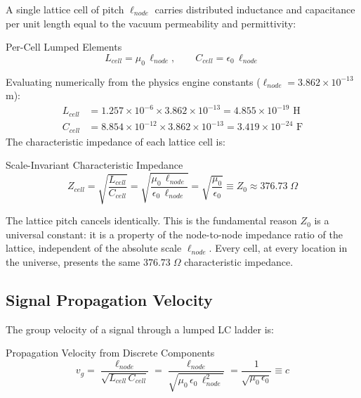 A single lattice cell of pitch $\ell_{node}$ carries distributed inductance and capacitance per unit length equal to the vacuum permeability and permittivity:
\begin{resultbox}{Per-Cell Lumped Elements}
\begin{equation}
    L_{cell} = \mu_0\, \ell_{node}, \qquad C_{cell} = \epsilon_0\, \ell_{node}
    \label{eq:cell_elements}
\end{equation}
\end{resultbox}

Evaluating numerically from the physics engine constants ($\ell_{node} = 3.862 \times 10^{-13}$ m):
\begin{align}
    L_{cell} &= 1.257 \times 10^{-6} \times 3.862 \times 10^{-13} = 4.855 \times 10^{-19} \text{ H} \\
    C_{cell} &= 8.854 \times 10^{-12} \times 3.862 \times 10^{-13} = 3.419 \times 10^{-24} \text{ F}
\end{align}
The characteristic impedance of each lattice cell is:
\begin{resultbox}{Scale-Invariant Characteristic Impedance}
\begin{equation}
    Z_{cell} = \sqrt{\frac{L_{cell}}{C_{cell}}} = \sqrt{\frac{\mu_0\, \ell_{node}}{\epsilon_0\, \ell_{node}}} = \sqrt{\frac{\mu_0}{\epsilon_0}} \equiv Z_0 \approx 376.73\;\Omega
    \label{eq:z0_cell}
\end{equation}
\end{resultbox}

The lattice pitch cancels identically. This is the fundamental reason $Z_0$ is a universal constant: it is a property of the node-to-node impedance ratio of the lattice, independent of the absolute scale $\ell_{node}$. Every cell, at every location in the universe, presents the same $376.73\;\Omega$ characteristic impedance.

\subsection{Signal Propagation Velocity}

The group velocity of a signal through a lumped LC ladder is:
\begin{resultbox}{Propagation Velocity from Discrete Components}
\begin{equation}
    v_g = \frac{\ell_{node}}{\sqrt{L_{cell}\, C_{cell}}} = \frac{\ell_{node}}{\sqrt{\mu_0\, \epsilon_0\, \ell_{node}^2}} = \frac{1}{\sqrt{\mu_0\, \epsilon_0}} \equiv c
    \label{eq:c_from_lc}
\end{equation}
\end{resultbox}

